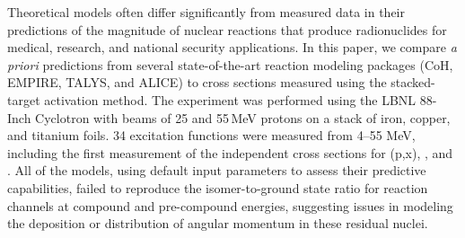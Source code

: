 


Theoretical models often differ significantly from measured data in their predictions of the magnitude of nuclear reactions that produce radionuclides for medical, research, and national security applications.
In this paper, we compare \emph{a priori} predictions from several state-of-the-art reaction modeling packages (CoH, EMPIRE, TALYS, and ALICE) to cross sections measured using the stacked-target activation method.  
The experiment was performed using the LBNL 88-Inch Cyclotron with beams of 25 and 55\,MeV protons on a stack of 
iron, copper, and titanium foils.  
34 excitation functions were measured from 4--55 MeV, including the first measurement of the independent cross sections for (p,x), , and .  
All of the models, using default input parameters to assess their predictive capabilities,  failed to reproduce the isomer-to-ground state ratio for 
reaction channels at 
compound and pre-compound energies, suggesting issues in modeling the deposition or distribution of angular momentum in these residual nuclei.  



